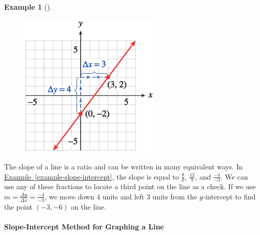 \documentclass[10pt,]{book}
\theoremstyle{plain}
\theoremstyle{definition}
\theoremstyle{definition}
\newtheorem{example}[theorem]{Example}
\numberwithin{equation}{section}
\begin{document}
\begin{example}[]
\leavevmode%
\begin{figure}
\centering
\includegraphics[width=0.60\textwidth,]{images/fig-slope-intercept.svg}\caption{\label{fig-slope-intercept}}
\end{figure}
\end{example}
\par
The slope of a line is a ratio and can be written in many equivalent ways. In \hyperref[example-slope-intercept]{Example~\ref{example-slope-intercept}}, the slope is equal to \(\frac{8}{6}\), \(\frac{12}{9}\), and \(\frac{−4}{−3}\). We can use any of these fractions to locate a third
point on the line as a check. If we use \(m = \frac{\Delta y}{\Delta x}= \frac{−4}{−3}\), we move down \(4\) units and left \(3\) units from the \(y\)-intercept to find the point \((−3, −6)\) on the line.%
\typeout{************************************************}
\typeout{************************************************}
\paragraph[Slope-Intercept Method for Graphing a Line]{Slope-Intercept Method for Graphing a Line}\label{paragraphs-15}
\end{document}
